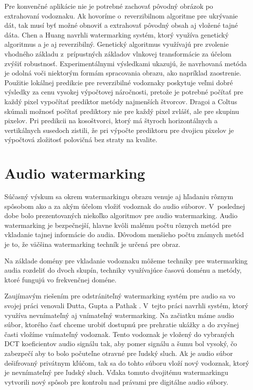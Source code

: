 Pre konvenčné aplikácie nie je potrebné zachovať pôvodný obrázok po extrahovaní vodoznaku. Ak hovoríme o~reverzibilnom algoritme pre ukrývanie dát, tak musí byť možné obnoviť a extrahovať pôvodný obsah aj vložené tajné dáta. Chen a Huang \cite{Chen2014} navrhli watermarking systém, ktorý využíva genetický algoritmus a je aj reverzibilný. Genetický algoritmus využívajú pre zvolenie vhodného základu z~prípustných základov vlnkovej transformácie za účelom zvýšiť robustnosť.
Experimentálnymi výsledkami ukazujú, že navrhovaná metóda je odolná voči niektorým formám spracovania obrazu, ako napríklad zaostrenie.
Použitie lokálnej predikcie pre reverzibilné vodoznaky poskytuje veľmi dobré výsledky za cenu vysokej výpočtovej náročnosti, pretože je potrebné počítať pre každý pixel vypočítať prediktor metódy najmenších štvorcov. Dragoi a Coltus \cite{Dragoi2015} skúmali možnosť počítať prediktory nie pre každý pixel zvlášť, ale pre skupinu pixelov. Pri predikcii na kosoštvorci, ktorý má štyroch horizontálnych a vertikálnych susedoch zistili, že pri výpočte prediktoru pre dvojicu pixelov je výpočtová zložitosť polovičná bez straty na kvalite.

\section{Audio watermarking}
Súčasný výskum sa okrem watermarkingu obrazu venuje aj hľadaniu rôznym spôsobom ako a za akým účelom vložiť vodoznak do audio súborov.
V~poslednej dobe bolo prezentovaných niekoľko algoritmov pre audio watermarking. Audio watermarking je bezpečnejší, hlavne kvôli malému počtu rôznych metód pre vkladanie tajnej informácie do audia. Dôvodom menšieho počtu známych metód je to, že väčšina watermarking techník je určená pre obraz. \cite{Zamani2015}

Na základe domény pre vkladanie vodoznaku môžeme techniky pre watermarking audia rozdeliť do dvoch skupín, techniky využívajúce časovú doménu a metódy, ktoré fungujú vo frekvenčnej doméne. \cite{Fallahpour}

Zaujímavým riešením pre odstrániteľný watermarking systém pre audio sa vo svojej práci venovali Dutta, Gupta a Pathak \cite{Dutta2014}. V~tejto práci navrhli systém, ktorý využíva nevnímateľný aj vnímateľný watermarking. Na začiatku máme audio súbor, ktorého časť chceme urobiť dostupnú pre prehratie ukážky a do zvyšnej časti vložíme vnímateľný vodoznak. Tento vodoznak je vložený do vybraných DCT koeficientov audio signálu tak, aby pomer signálu a šumu bol vysoký, čo zabezpečí aby to bolo počuteľne otravné pre ľudský sluch. Ak je audio súbor dešifrovaný privátnym kľúčom, tak sa do tohto súboru vloží nový vodoznak, ktorý je nevnímateľný pre ľudský sluch. Vďaka tomuto dvojitému watermarkingu vytvorili nový spôsob pre kontrolu nad právami pre digitálne audio súbory.

